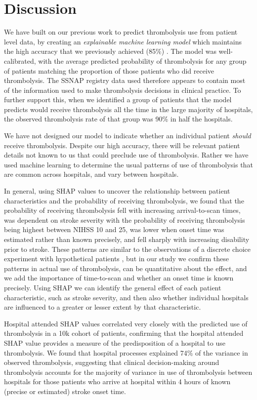\section{Discussion}

We have built on our previous work to predict thrombolysis use from patient level data, by creating an \emph{explainable machine learning model} which maintains the high accuracy that we previously achieved (85\%) \cite{allen_use_2022}. The model was well-calibrated, with the average predicted probability of thrombolysis for any group of patients matching the proportion of those patients who did receive thrombolysis. The SSNAP registry data used therefore appears to contain most of the information used to make thrombolysis decisions in clinical practice. To further support this, when we identified a group of patients that the model predicts would receive thrombolysis all the time in the large majority of hospitals, the observed thrombolysis rate of that group was 90\% in half the hospitals.

We have not designed our model to indicate whether an individual patient \emph{should} receive thrombolysis. Despite our high accuracy, there will be relevant patient details not known to us that could preclude use of thrombolysis. Rather we have used machine learning to determine the usual patterns of use of thrombolysis that are common across hospitals, and vary between hospitals. 

In general, using SHAP values to uncover the relationship between patient characteristics and the probability of receiving thrombolysis, we found that the probability of receiving thrombolysis fell with increasing arrival-to-scan times, was dependent on stroke severity with the probability of receiving thrombolysis being highest between NIHSS 10 and 25, was lower when onset time was estimated rather than known precisely, and fell sharply with increasing disability prior to stroke. These patterns are similar to the observations of a discrete choice experiment with hypothetical patients \cite{de_brun_factors_2018}, but in our study we confirm these patterns in actual use of thrombolysis, can be quantitative about the effect, and we add the importance of time-to-scan and whether an onset time is known precisely. Using SHAP we can identify the general effect of each patient characteristic, such as stroke severity, and then also whether individual hospitals are influenced to a greater or lesser extent by that characteristic.

Hospital attended SHAP values correlated very closely with the predicted use of thrombolysis in a 10k cohort of patients, confirming that the hospital attended SHAP value provides a measure of the predisposition of a hospital to use thrombolysis. We found that hospital processes explained 74\% of the variance in observed thrombolysis, suggesting that clinical decision-making around thrombolysis accounts for the majority of variance in use of thrombolysis between hospitals for those patients who arrive at hospital within 4 hours of known (precise or estimated) stroke onset time. 


